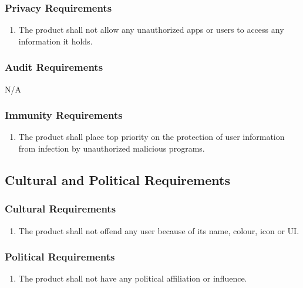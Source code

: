 \documentclass[]{article}
\begin{document}
\subsubsection{Privacy Requirements}
\label{ssub:privacy_requirements}
\begin{enumerate}[{SR}3. ]
	\item The product shall not allow any unauthorized apps or users to access any information it holds.
\end{enumerate}

\subsubsection{Audit Requirements}
\label{ssub:audit_requirements}
N/A

\subsubsection{Immunity Requirements}
\label{ssub:immunity_requirements}
\begin{enumerate}[{SR}4. ]
	\item The product shall place top priority on the protection of user information from infection by unauthorized malicious programs.
\end{enumerate}


\subsection{Cultural and Political Requirements}
\label{sub:cultural_and_political_requirements}

\subsubsection{Cultural Requirements}
\label{ssub:cultural_requirements}
\begin{enumerate}[{CP}1. ]
	\item The product shall not offend any user because of its name, colour, icon or UI.
\end{enumerate}

\subsubsection{Political Requirements}
\label{ssub:political_requirements}
\begin{enumerate}[{CP}2. ]
	\item The product shall not have any political affiliation or influence.
\end{enumerate}
\end{document}
